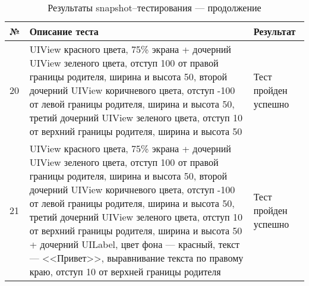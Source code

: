 \begin{table}[!htb]
 \label{table:tests4}
 \begin{center}
  \caption{Результаты snapshot--тестирования --- продолжение}
 \begin{tabular}{|p{0.6cm}|p{10cm}|p{5cm}|}
  \hline
   \bfseries № & \bfseries Описание теста & \bfseries Результат \\ \hline
   20 & UIView красного цвета, 75\% экрана + дочерний UIView зеленого цвета, отступ 100 от правой границы родителя, ширина и высота 50, второй дочерний UIView коричневого цвета, отступ -100 от левой границы родителя, ширина и высота 50, третий дочерний UIView зеленого цвета, отступ 10 от верхний границы родителя, ширина и высота 50 & Тест пройден успешно  \\ \hline
   21 & UIView красного цвета, 75\% экрана + дочерний UIView зеленого цвета, отступ 100 от правой границы родителя, ширина и высота 50, второй дочерний UIView коричневого цвета, отступ -100 от левой границы родителя, ширина и высота 50, третий дочерний UIView зеленого цвета, отступ 10 от верхний границы родителя, ширина и высота 50 + дочерний UILabel, цвет фона --- красный, текст --- <<Привет>>, выравнивание текста по правому краю, отступ 10 от верхней границы родителя & Тест пройден успешно  \\ \hline  \end{tabular}
 \end{center}
\end{table}


\pagebreak